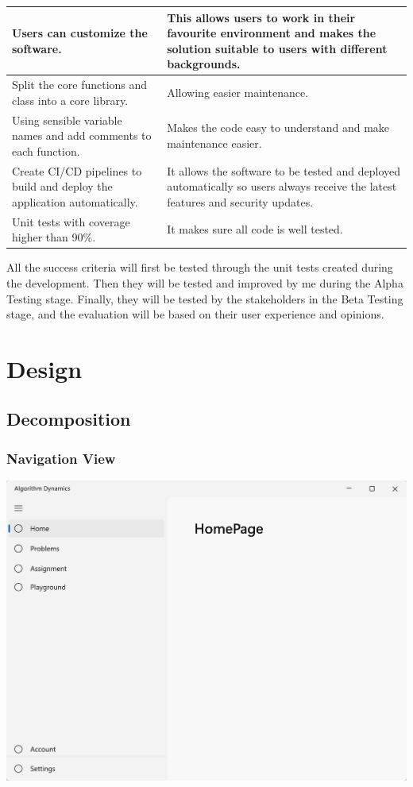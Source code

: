 \documentclass[a4paper]{report}
\begin{document}
\begin{tabulary}{\linewidth}{|L|L|}
      \hline
      Users can customize the software. & This allows users to work in their favourite environment and makes the solution suitable to users with different backgrounds.\\
      \hline
      Split the core functions and class into a core library. & Allowing easier maintenance. \\
      \hline
      Using sensible variable names and add comments to each function. & Makes the code easy to understand and make maintenance easier.\\
      \hline
      Create CI/CD pipelines to build and deploy the application automatically. & It allows the software to be tested and deployed automatically so users always receive the latest features and security updates.\\
      \hline
      Unit tests with coverage higher than 90\%. & It makes sure all code is well tested. \\
      \hline
\end{tabulary}

All the success criteria will first be tested through the unit tests created during the development. Then they will be tested and improved by me during the Alpha Testing stage. Finally, they will be tested by the stakeholders in the Beta Testing stage, and the evaluation will be based on their user experience and opinions.

\chapter{Design}
\section{Decomposition}




\subsection{Navigation View}

\includegraphics[width=\textwidth, height=\textheight, keepaspectratio]{NavigationView-Design}
\end{document}

